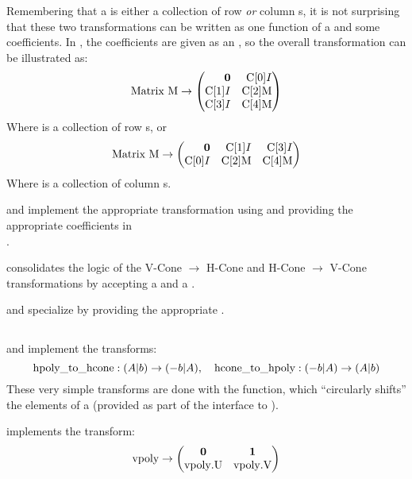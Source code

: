 Remembering that a  is either a collection of row \textit{or} column s, it is not surprising that these two transformations can be written as one function of a  and some coefficients.  In , the coefficients are given as an , so the overall transformation can be illustrated as:
\newcommand{\CA}[1]{\mli{C[#1]}}
\[ \mli{Matrix M} \to
	\begin{pmatrix*}[r]
		\0 & \CA{0}I \\
		\CA{1}I & \CA{2}\mli{M} \\
		\CA{3}I & \CA{4}\mli{M}
	\end{pmatrix*} \]
Where  is a collection of row s, or
\[ \mli{Matrix M} \to
	\begin{pmatrix*}[r]
		\0 & \CA{1}I & \CA{3}I \\
		\CA{0}I & \CA{2}\mli{M} & \CA{4}\mli{M}
	\end{pmatrix*} \]
Where  is a collection of column s.
\lstgeneralizedlift

 and  implement the appropriate transformation using  and providing the appropriate coefficients in \\
.
\lstliftvcone
\lstlifthcone

 consolidates the logic of the V-Cone $\to$ H-Cone and H-Cone $\to$ V-Cone transformations by accepting a  and a .
\lstconetransform

 and  specialize  by providing the appropriate .
\lstvconetohcone
\lsthconetovcone

\subsection{}

 and  implement the  transforms:
\[ \mli{hpoly_to_hcone}: (A|b) \to (-b|A),\quad \mli{hcone_to_hpoly} : (-b|A) \to (A|b) \]
These very simple transforms are done with the  function, which ``circularly shifts'' the elements of a  (provided as part of the interface to ).
\lsthpolytohcone
\lsthconetohpoly

 implements the  transform:
\[ \mli{vpoly} \to
	\begin{pmatrix}
		\0 & \vec{1} \\ \mli{vpoly.U} & \mli{vpoly.V}
	\end{pmatrix} \]
\lstvpolytovcone

